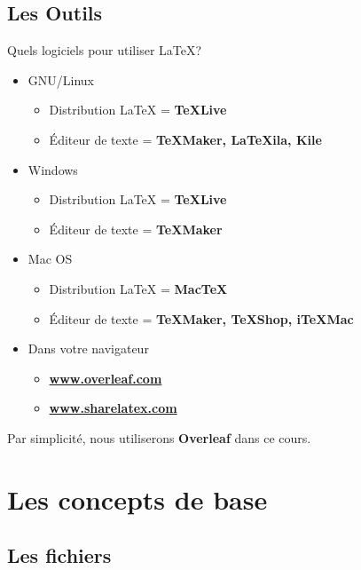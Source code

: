 \documentclass[10pt,svgnames,usenames,table]{beamer} %
\begin{document}
\subsection{Les Outils}
\begin{frame}{Quels logiciels pour utiliser \LaTeX{}?}

  \begin{itemize}
	  \item GNU/Linux
	  \begin{itemize}
	  	\item Distribution \LaTeX{} = \textbf{TeXLive}
		\item Éditeur de texte = \textbf{TeXMaker, LaTeXila, Kile}
	  \end{itemize}
	  \item Windows
	  \begin{itemize}
	  	\item Distribution \LaTeX{} = \textbf{TeXLive}
		\item Éditeur de texte = \textbf{TeXMaker}
	  \end{itemize}
	  \item Mac OS
	  \begin{itemize}
	  	\item Distribution \LaTeX{} = \textbf{MacTeX}
		\item Éditeur de texte = \textbf{TeXMaker, TeXShop, iTeXMac}
	  \end{itemize}
	  \item Dans votre navigateur
	  \begin{itemize}
		\item \textbf{\url{www.overleaf.com}}
  		\item \textbf{\url{www.sharelatex.com}}
	  \end{itemize}
  \end{itemize}
  Par simplicité, nous utiliserons \textbf{Overleaf} dans ce cours.
\end{frame}

\section{Les concepts de base}
\subsection{Les fichiers}
\end{document}
